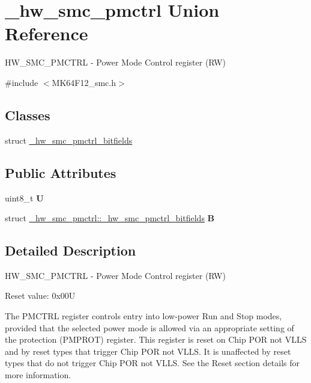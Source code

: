 \hypertarget{union__hw__smc__pmctrl}{}\section{\+\_\+hw\+\_\+smc\+\_\+pmctrl Union Reference}
\label{union__hw__smc__pmctrl}


H\+W\+\_\+\+S\+M\+C\+\_\+\+P\+M\+C\+T\+RL -\/ Power Mode Control register (RW)  




{\ttfamily \#include $<$M\+K64\+F12\+\_\+smc.\+h$>$}

\subsection*{Classes}
\begin{DoxyCompactItemize}
\item 
struct \hyperlink{struct__hw__smc__pmctrl_1_1__hw__smc__pmctrl__bitfields}{\+\_\+hw\+\_\+smc\+\_\+pmctrl\+\_\+bitfields}
\end{DoxyCompactItemize}
\subsection*{Public Attributes}
\begin{DoxyCompactItemize}
\item 
uint8\+\_\+t {\bfseries U}\hypertarget{union__hw__smc__pmctrl_a1fcfdf82c36b0fe3d9e9df428ce03c90}{}\label{union__hw__smc__pmctrl_a1fcfdf82c36b0fe3d9e9df428ce03c90}

\item 
struct \hyperlink{struct__hw__smc__pmctrl_1_1__hw__smc__pmctrl__bitfields}{\+\_\+hw\+\_\+smc\+\_\+pmctrl\+::\+\_\+hw\+\_\+smc\+\_\+pmctrl\+\_\+bitfields} {\bfseries B}\hypertarget{union__hw__smc__pmctrl_af259fb2db1f21d05dfb8095c59469eb0}{}\label{union__hw__smc__pmctrl_af259fb2db1f21d05dfb8095c59469eb0}

\end{DoxyCompactItemize}


\subsection{Detailed Description}
H\+W\+\_\+\+S\+M\+C\+\_\+\+P\+M\+C\+T\+RL -\/ Power Mode Control register (RW) 

Reset value\+: 0x00U

The P\+M\+C\+T\+RL register controls entry into low-\/power Run and Stop modes, provided that the selected power mode is allowed via an appropriate setting of the protection (P\+M\+P\+R\+OT) register. This register is reset on Chip P\+OR not V\+L\+LS and by reset types that trigger Chip P\+OR not V\+L\+LS. It is unaffected by reset types that do not trigger Chip P\+OR not V\+L\+LS. See the Reset section details for more information. 


